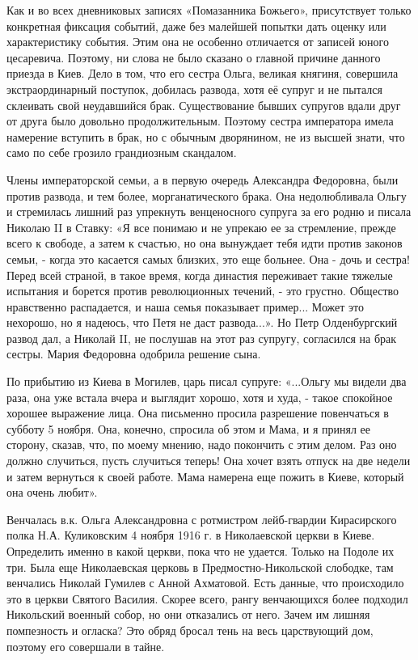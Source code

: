 Как и во всех дневниковых записях «Помазанника Божьего», присутствует только
конкретная фиксация событий, даже без малейшей попытки дать оценку или
характеристику события. Этим она не особенно отличается от записей юного
цесаревича. Поэтому, ни слова не было сказано о главной причине данного приезда
в Киев. Дело в том, что его сестра Ольга, великая княгиня, совершила
экстраординарный поступок, добилась развода, хотя её супруг и не пытался
склеивать свой неудавшийся брак. Существование бывших супругов вдали друг от
друга было довольно продолжительным. Поэтому сестра императора имела намерение
вступить в брак, но с обычным дворянином, не из высшей знати, что само по себе
грозило грандиозным скандалом. 

Члены императорской семьи, а в первую очередь Александра Федоровна, были против
развода, и тем более, морганатического брака.  Она недолюбливала Ольгу и
стремилась лишний раз упрекнуть венценосного супруга за его родню и писала
Николаю II в Ставку: «Я все понимаю и не упрекаю ее за стремление, прежде всего
к свободе, а затем к счастью, но она вынуждает тебя идти против законов семьи,
- когда это касается самых близких, это еще больнее.  Она - дочь и сестра!
Перед всей страной, в такое время, когда династия переживает такие тяжелые
испытания и борется против революционных течений, - это грустно. Общество
нравственно распадается, и наша семья показывает пример...  Может это нехорошо,
но я надеюсь, что Петя не даст развода...». Но Петр Олденбургский развод дал, а
Николай II, не послушав на этот раз супругу, согласился на брак сестры. Мария
Федоровна одобрила решение сына. 

По прибытию из Киева в Могилев, царь писал супруге: «...Ольгу мы видели два
раза, она уже встала вчера и выглядит хорошо, хотя и худа, - такое спокойное
хорошее выражение лица. Она письменно просила разрешение повенчаться в субботу
5 ноября. Она, конечно, спросила об этом и Мама, и я принял ее сторону, сказав,
что, по моему мнению, надо покончить с этим делом. Раз оно должно случиться,
пусть случиться теперь! Она хочет взять отпуск на две недели и затем вернуться
к своей работе. Мама намерена еще пожить в Киеве, который она очень любит».

Венчалась в.к. Ольга Александровна с ротмистром лейб-гвардии Кирасирского полка
Н.А. Куликовским 4 ноября 1916 г. в Николаевской церкви в Киеве. Определить
именно в какой церкви, пока что не удается. Только на Подоле их три. Была еще
Николаевская церковь в Предмостно-Никольской слободке, там венчались Николай
Гумилев с Анной Ахматовой. Есть данные, что происходило это в церкви Святого
Василия. Скорее всего, рангу венчающихся более подходил Никольский военный
собор, но они отказались от него. Зачем им лишняя помпезность и огласка? Это
обряд бросал тень на весь царствующий дом, поэтому его совершали в тайне. 

